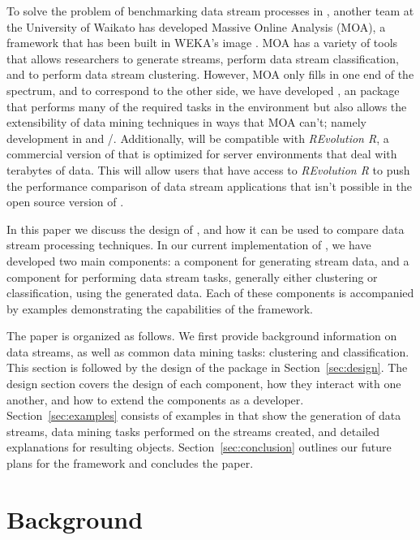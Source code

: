 \documentclass[nojss]{jss}
\begin{document}
To solve the problem of benchmarking data stream processes in , another team at the University of Waikato has developed Massive Online Analysis (MOA), a framework that has been built in WEKA's image \citep{stream:Bifet+Holmes+Kirkby+Pfahringer:2010}. MOA has a variety of tools that allows researchers to generate streams, perform data stream classification, and to perform data stream clustering. However, MOA only fills in one end of the spectrum, and to correspond to the other side, we have developed , an  package that performs many of the required tasks in the  environment but also allows the extensibility of data mining techniques in ways that MOA can't; namely development in  and /. Additionally,  will be compatible with \textit{REvolution R}, a commercial version of  that is optimized for server environments that deal with terabytes of data. This will allow users that have access to \textit{REvolution R} to push the performance comparison of data stream applications that isn't possible in the open source version of  \citep{stream:revolutionR:2010}.


In this paper we discuss the design of , and how it can be used to compare data stream processing techniques. In our current implementation of , we have developed two main components: a component for generating stream data, and a component for performing data stream tasks, generally either clustering or classification, using the generated data. Each of these components is accompanied by examples demonstrating the capabilities of the framework. 


The paper is organized as follows. We first provide background information on data streams, as well as common data mining tasks: clustering and classification. This section is followed by the design of the  package in Section~\ref{sec:design}. The design section covers the design of each component, how they interact with one another, and how to extend the components as a developer. Section~\ref{sec:examples} consists of examples in  that show the generation of data streams, data mining tasks performed on the streams created, and detailed explanations for resulting objects. Section~\ref{sec:conclusion} outlines our future plans for the framework and concludes the paper.

\section{Background}
\label{sec:background}
\end{document}
